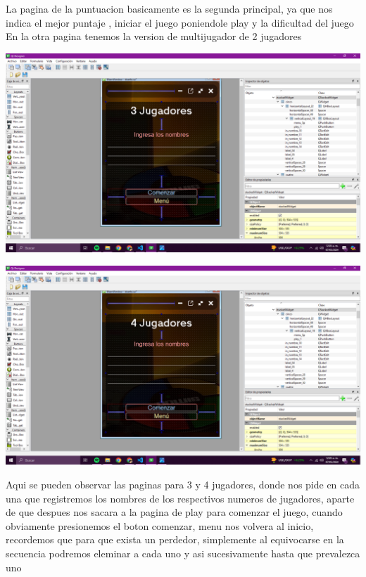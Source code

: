 \documentclass{article}
\begin{document}
\vspace{0.2cm}

{\Large La pagina de la puntuacion basicamente es la segunda principal, ya que nos indica el mejor puntaje , iniciar el juego poniendole play y la dificultad del juego 
 \\En la otra pagina tenemos la version de multijugador de 2 jugadores }




\newpage
\vspace{0.2cm}
\includegraphics[width=1\linewidth]{Captura de pantalla (759).png}

\vspace{0.2cm}


\includegraphics[width=1\linewidth]{Captura de pantalla (760).png}

\vspace{0.2cm}


{\Large Aqui se pueden observar las paginas para 3 y 4 jugadores, donde nos pide en cada una que registremos los nombres de los respectivos numeros de jugadores, aparte de que despues nos sacara a la pagina de play para comenzar el juego, cuando obviamente presionemos el boton comenzar, menu nos volvera al inicio, recordemos que para que exista un perdedor, simplemente al equivocarse en la secuencia podremos eleminar a cada uno y asi sucesivamente hasta que prevalezca uno\\ }
\end{document}
